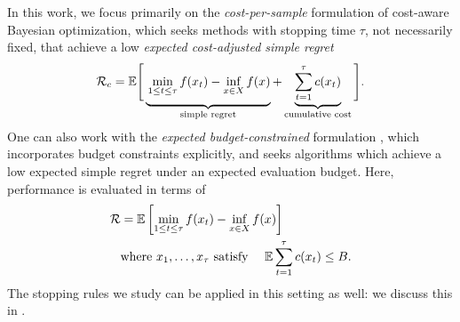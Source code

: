 In this work, we focus primarily on the \emph{cost-per-sample} formulation \citep{chick2012sequential,cashore2016multi,xie2024cost} of cost-aware Bayesian optimization, which seeks methods with stopping time $\tau$, not necessarily fixed, that achieve a low \emph{expected cost-adjusted simple regret}
\begin{equation}
\mathcal{R}_c = \mathbb{E} \Bigg[\underbrace{\vphantom{\sum_{t=1}^{\tau}}\min_{1\le t \le \tau} f(x_t) - \inf_{x \in X} f(x)}_{\text{simple regret}} + \underbrace{\sum_{t=1}^{\tau} c(x_t)
    }_{\text{cumulative cost}}\Bigg] \label{eqn:cost_per_sample}
    .
\end{equation}
One can also work with the \emph{expected budget-constrained} formulation \citep{xie2024cost}, which incorporates budget constraints explicitly, and seeks algorithms which achieve a low expected simple regret under an expected evaluation budget.
Here, performance is evaluated in terms of
\begin{align}
\mathcal{R} &= \mathbb{E} \left[\min_{1\leq t\leq {\tau}} f(x_t) - \inf_{x\in X} f(x)\right] \nonumber \\
&\text{where } x_1,\ldots,x_{\tau} \text{ satisfy \quad } 
\mathbb{E}\sum\limits_{t=1}^{\tau} c(x_t) \leq B. \label{eqn:cost_aware_bayesopt_problem}
\end{align}
The stopping rules we study can be applied in this setting as well: we discuss this in .

